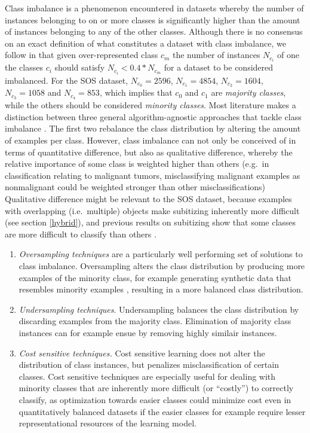 \documentclass[twocolumn]{article}
\providecommand{\tightlist}{%
  \setlength{\itemsep}{0pt}\setlength{\parskip}{0pt}}
\begin{document}
Class imbalance is a phenomenon encountered in datasets whereby the
number of instances belonging to on or more classes is significantly
higher than the amount of instances belonging to any of the other
classes. Although there is no consensus on an exact definition of what
constitutes a dataset with class imbalance, we follow
\citet{fernandez2013} in that given over-represented class \(c_m\) the
number of instances \(N_{c_i}\) of one the classes \(c_i\) should
satisfy \(N_{c_i} < 0.4 * N_{c_m}\) for a dataset to be considered
imbalanced. For the SOS dataset, \(N_{c_0} = 2596\), \(N_{c_1} = 4854\),
\(N_{c_2} = 1604\), \(N_{c_3} = 1058\) and \(N_{c_4} = 853\), which
implies that \(c_0\) and \(c_1\) are \emph{majority classes}, while the
others should be considered \emph{minority classes}. Most literature
makes a distinction between three general algorithm-agnostic approaches
that tackle class imbalance \citep[for a discussion,
see][]{fernandez2013}. The first two rebalance the class distribution by
altering the amount of examples per class. However, class imbalance can
not only be conceived of in terms of quantitative difference, but also
as qualitative difference, whereby the relative importance of some class
is weighted higher than others (e.g.~in classification relating to
malignant tumors, misclassifying malignant examples as nonmalignant
could be weighted stronger than other misclassifications) Qualitative
difference might be relevant to the SOS dataset, because examples with
overlapping (i.e.~multiple) objects make subitizing inherently more
difficult (see section \ref{hybrid}), and previous results on
subitizing show that some classes are more difficult to classify than
others \citep{zhang2016salient}.

\begin{enumerate}[noitemsep, topsep=0pt]
\def\labelenumi{\arabic{enumi}.}
\tightlist
\item
  \emph{Oversampling techniques} are a particularly well performing set
  of solutions to class imbalance. Oversampling alters the class
  distribution by producing more examples of the minority class, for
  example generating synthetic data that resembles minority examples
  \citep[e.g.][]{he2008adasyn, chawla2002smote}, resulting in a more
  balanced class distribution.
\item
  \emph{Undersampling techniques}. Undersampling balances the class
  distribution by discarding examples from the majority class.
  Elimination of majority class instances can for example ensue by
  removing highly similair instances.
  \citep[e.g.][]{tomek1976two}
\item
  \emph{Cost sensitive techniques.} Cost sensitive learning does not
  alter the distribution of class instances, but penalizes
  misclassification of certain classes. Cost sensitive techniques are
  especially useful for dealing with minority classes that are
  inherently more difficult (or ``costly'') to correctly classify, as
  optimization towards easier classes could minimize cost even in
  quantitatively balanced datasets if the easier classes for example
  require lesser representational resources of the learning model.
\end{enumerate}
\end{document}
